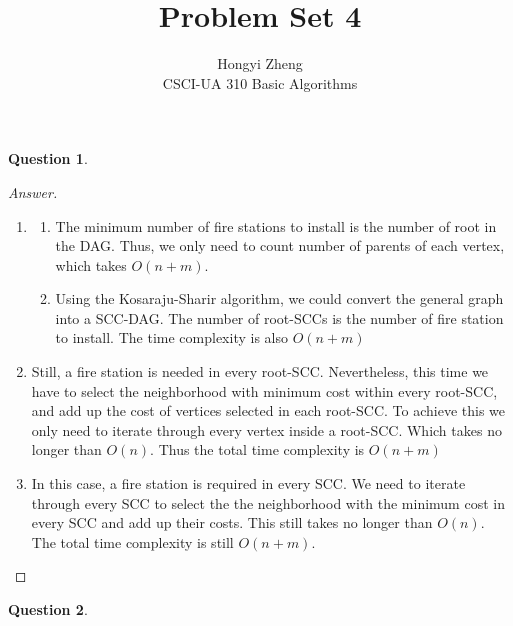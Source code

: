 \documentclass{article}
\title{Problem Set 4}
\author{%
    Hongyi Zheng
\\  CSCI-UA 310 Basic Algorithms
}
\theoremstyle{plain}
\newtheorem{question}{Question}
\newenvironment{answer}[1][Answer]
    {\begin{proof}[#1]{$ $}\renewcommand\qedsymbol{$\vartriangle$}}
    {\end{proof}}
\begin{document}
\maketitle


\begin{question}
\end{question}
\begin{answer}
    \begin{enumerate}
        \item
        \begin{enumerate}
            \item
            The minimum number of fire stations to install is the number of root in the DAG. Thus, we only need to count number of parents of each vertex, which takes $O(n+m)$.
            \item
            Using the Kosaraju-Sharir algorithm, we could convert the general graph into a SCC-DAG. The number of root-SCCs is the number of fire station to install. The time complexity is also $O(n+m)$
        \end{enumerate}
        \item
        Still, a fire station is needed in every root-SCC. Nevertheless, this time we have to select the neighborhood with minimum cost within every root-SCC, and add up the cost of vertices selected in each root-SCC. To achieve this we only need to iterate through every vertex inside a root-SCC. Which takes no longer than $O(n)$. Thus the total time complexity is $O(n+m)$
        \item
        In this case, a fire station is required in every SCC. We need to iterate through every SCC to select the the neighborhood with the minimum cost in every SCC and add up their costs. This still takes no longer than $O(n)$. The total time complexity is still $O(n+m)$.
    \end{enumerate}
\end{answer}

\begin{question}
\end{question}
\end{document}
